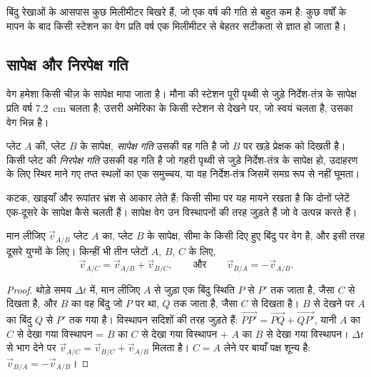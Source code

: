 बिंदु रेखाओं के आसपास कुछ मिलीमीटर बिखरे हैं, जो एक वर्ष की
गति से बहुत कम है: कुछ वर्षों के मापन के बाद किसी
स्टेशन का वेग प्रति वर्ष एक मिलीमीटर से बेहतर सटीकता से ज्ञात हो जाता है।

\subsection{सापेक्ष और निरपेक्ष गति}

वेग हमेशा किसी चीज़ के सापेक्ष मापा जाता है। मौना की
स्टेशन पूरी पृथ्वी से जुड़े निर्देश-तंत्र के सापेक्ष प्रति वर्ष \qty{7.2}{cm} चलता है;
उत्तरी अमेरिका के किसी स्टेशन से देखने पर, जो स्वयं चलता है, उसका
वेग भिन्न है।

\begin{definition}[सापेक्ष गति; निरपेक्ष गति]\label{def:g11:plate-motions:relative-motion}
प्लेट $A$ की, प्लेट $B$ के सापेक्ष, \emph{सापेक्ष गति}
उसकी वह गति है जो $B$ पर खड़े प्रेक्षक को दिखती है।
किसी प्लेट की \emph{निरपेक्ष गति} उसकी वह गति है
जो गहरी पृथ्वी से जुड़े निर्देश-तंत्र के सापेक्ष हो, उदाहरण के लिए स्थिर माने गए
तप्त स्थलों का एक समुच्चय, या वह निर्देश-तंत्र जिसमें  समग्र रूप से
नहीं घूमता।
\end{definition}

कटक, खाइयाँ और रूपांतर भ्रंश  से आकार लेते हैं: किसी सीमा पर
यह मायने रखता है कि दोनों प्लेटें एक-दूसरे के सापेक्ष कैसे चलती हैं।
सापेक्ष वेग उन विस्थापनों की तरह जुड़ते हैं जो वे उत्पन्न करते हैं।

\begin{proposition}[सापेक्ष वेग तीरों की तरह जुड़ते हैं]\label{prop:g11:plate-motions:sum}
मान लीजिए $\vec v_{A/B}$ प्लेट $A$ का, प्लेट $B$ के सापेक्ष, सीमा के
किसी दिए हुए बिंदु पर वेग है, और इसी तरह दूसरे युग्मों के लिए। किन्हीं भी तीन
प्लेटों $A$, $B$, $C$ के लिए,
\[
  \vec v_{A/C} = \vec v_{A/B} + \vec v_{B/C},
  \qquad\text{और}\qquad
  \vec v_{B/A} = -\vec v_{A/B}.
\]
\end{proposition}

\begin{proof}
थोड़े समय $\Delta t$ में, मान लीजिए $A$ से जुड़ा एक बिंदु स्थिति $P$
से $P'$ तक जाता है, जैसा $C$ से दिखता है, और $B$ का वह बिंदु जो $P$ पर था,
$Q$ तक जाता है, जैसा $C$ से दिखता है। $B$ से देखने पर $A$ का बिंदु $Q$ से
$P'$ तक गया है। विस्थापन सदिशों की तरह जुड़ते हैं:
$\overrightarrow{PP'} = \overrightarrow{PQ} + \overrightarrow{QP'}$, यानी
$A$ का $C$ से देखा गया विस्थापन = $B$ का $C$ से देखा गया विस्थापन +
$A$ का $B$ से देखा गया विस्थापन। $\Delta t$ से भाग देने पर $\vec v_{A/C}
= \vec v_{B/C} + \vec v_{A/B}$ मिलता है। $C = A$ लेने पर बायाँ पक्ष शून्य है: $\vec
v_{B/A} = -\vec v_{A/B}$।
\end{proof}

